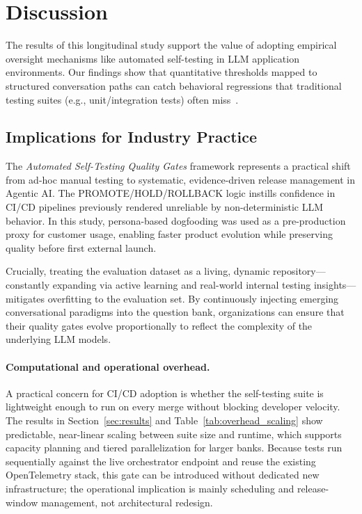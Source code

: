 \section{Discussion}
\label{sec:discussion}

The results of this longitudinal study support the value of adopting empirical oversight mechanisms like automated self-testing in LLM application environments. Our findings show that quantitative thresholds mapped to structured conversation paths can catch behavioral regressions that traditional testing suites (e.g., unit/integration tests) often miss~\cite{dobslaw2025testing}.

\subsection{Implications for Industry Practice}
The \textit{Automated Self-Testing Quality Gates} framework represents a practical shift from ad-hoc manual testing to systematic, evidence-driven release management in Agentic AI. The PROMOTE/HOLD/ROLLBACK logic instills confidence in CI/CD pipelines previously rendered unreliable by non-deterministic LLM behavior. In this study, persona-based dogfooding was used as a pre-production proxy for customer usage, enabling faster product evolution while preserving quality before first external launch.

Crucially, treating the evaluation dataset as a living, dynamic repository---constantly expanding via active learning and real-world internal testing insights---mitigates overfitting to the evaluation set. By continuously injecting emerging conversational paradigms into the question bank, organizations can ensure that their quality gates evolve proportionally to reflect the complexity of the underlying LLM models.

\paragraph{Computational and operational overhead.}
A practical concern for CI/CD adoption is whether the self-testing suite is lightweight enough to run on every merge without blocking developer velocity. The results in Section~\ref{sec:results} and Table~\ref{tab:overhead_scaling} show predictable, near-linear scaling between suite size and runtime, which supports capacity planning and tiered parallelization for larger banks. Because tests run sequentially against the live orchestrator endpoint and reuse the existing OpenTelemetry stack, this gate can be introduced without dedicated new infrastructure; the operational implication is mainly scheduling and release-window management, not architectural redesign.

